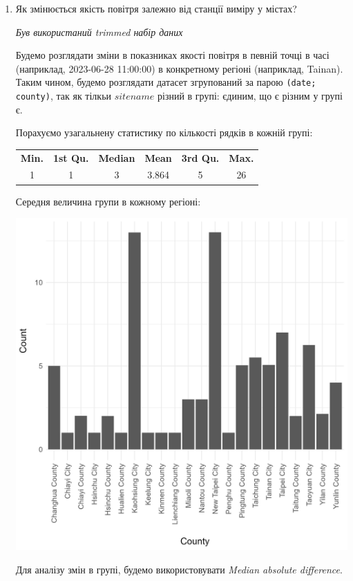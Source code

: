 \documentclass[./report.tex]{subfiles}
\begin{document}
\begin{enumerate}
  \pagebreak

  \item Як змінюється якість повітря залежно від станції виміру у містах?

  \quad \textit{Був використаний trimmed набір даних}

  Будемо розглядати зміни в показниках якості повітря в певній точці в часі (наприклад, 2023-06-28 11:00:00) в
  конкретному регіоні (наприклад, Tainan). Таким чином, будемо розглядати датасет
  згрупований за парою \verb|(date; county)|, так як тілкьи $sitename$ різний в групі:
  єдиним, що є різним у групі є.

  Порахуємо узагальнену статистику по кількості рядків в кожній групі:

  \begin{tabular}{cccccc}
    \textbf{Min.} & \textbf{1st Qu.}  & \textbf{Median} & \textbf{Mean} & \textbf {3rd Qu.} & \textbf{Max.} \\
    1 &  1  & 3 & 3.864 & 5 & 26 \\
  \end{tabular}

  Середня величина групи в кожному регіоні:

  \includegraphics[width=\linewidth]{plots/question7/bar-count.png}

  Для аналізу змін в групі, будемо використовувати \textit{Median absolute difference}.


\end{enumerate}
\end{document}
